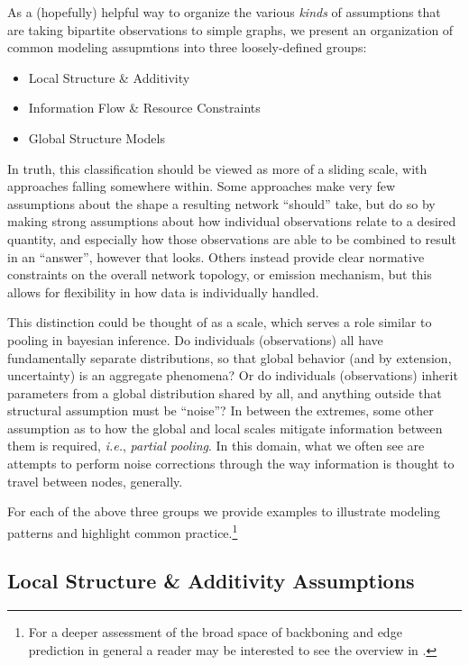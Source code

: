 \documentclass[%
	12pt,
		oneside,
		letterpaper
]{book}
\providecommand{\tightlist}{%
  \setlength{\itemsep}{0pt}\setlength{\parskip}{0pt}}\usepackage{longtable,booktabs,array}
\begin{document}
As a (hopefully) helpful way to organize the various \emph{kinds} of
assumptions that are taking bipartite observations to simple graphs, we
present an organization of common modeling assupmtions into three
loosely-defined groups:

\begin{itemize}
\tightlist
\item
  Local Structure \& Additivity
\item
  Information Flow \& Resource Constraints
\item
  Global Structure Models
\end{itemize}

In truth, this classification should be viewed as more of a sliding
scale, with approaches falling somewhere within. Some approaches make
very few assumptions about the shape a resulting network ``should''
take, but do so by making strong assumptions about how individual
observations relate to a desired quantity, and especially how those
observations are able to be combined to result in an ``answer'', however
that looks. Others instead provide clear normative constraints on the
overall network topology, or emission mechanism, but this allows for
flexibility in how data is individually handled.

This distinction could be thought of as a scale, which serves a role
similar to pooling in bayesian inference. Do individuals (observations)
all have fundamentally separate distributions, so that global behavior
(and by extension, uncertainty) is an aggregate phenomena? Or do
individuals (observations) inherit parameters from a global distribution
shared by all, and anything outside that structural assumption must be
``noise''? In between the extremes, some other assumption as to how the
global and local scales mitigate information between them is required,
\emph{i.e.}, \emph{partial pooling}. In this domain, what we often see
are attempts to perform noise corrections through the way information is
thought to travel between nodes, generally.

For each of the above three groups we provide examples to illustrate
modeling patterns and highlight common practice.\footnote{ For a deeper
  assessment of the broad space of backboning and edge prediction in
  general a reader may be interested to see the overview in
  \textcite{atlasaspiringnetwork_Coscia2021}.}

\subsection{Local Structure \& Additivity
Assumptions}\label{local-structure-additivity-assumptions}
\end{document}
